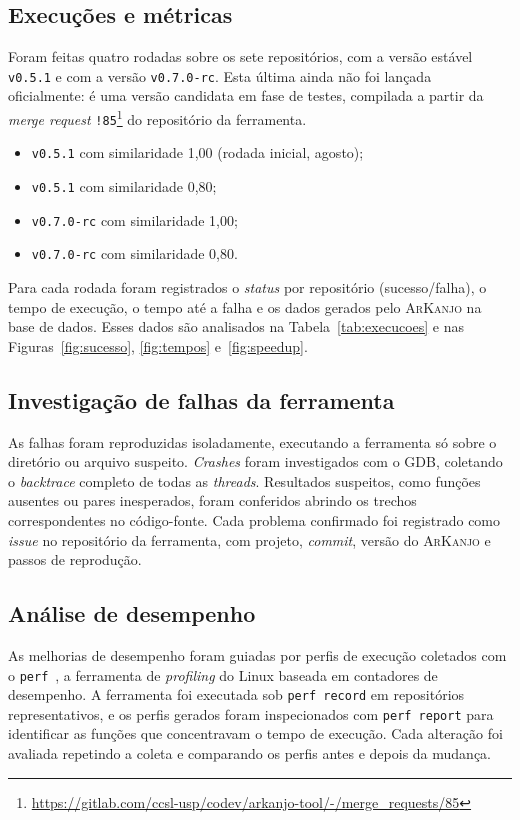 \documentclass{article}
\newcommand{\ark}{\textsc{ArKanjo}}
\newcommand{\vnova}{\texttt{v0.7.0-rc}}
\begin{document}
\subsection{Execuções e métricas}

Foram feitas quatro rodadas sobre os sete repositórios, com a versão estável \texttt{v0.5.1} e com a versão \vnova{}. Esta última ainda não foi lançada oficialmente: é uma versão candidata em fase de testes, compilada a partir da \textit{merge request} \verb|!85|\footnote{\url{https://gitlab.com/ccsl-usp/codev/arkanjo-tool/-/merge_requests/85}} do repositório da ferramenta.

\begin{itemize}
  \item \texttt{v0.5.1} com similaridade 1,00 (rodada inicial, agosto);
  \item \texttt{v0.5.1} com similaridade 0,80;
  \item \vnova{} com similaridade 1,00;
  \item \vnova{} com similaridade 0,80.
\end{itemize}

Para cada rodada foram registrados o \textit{status} por repositório (sucesso/falha), o tempo de execução, o tempo até a falha e os dados gerados pelo \ark{} na base de dados. Esses dados são analisados na Tabela~\ref{tab:execucoes} e nas Figuras~\ref{fig:sucesso}, \ref{fig:tempos} e~\ref{fig:speedup}.

\subsection{Investigação de falhas da ferramenta}

As falhas foram reproduzidas isoladamente, executando a ferramenta só sobre o diretório ou arquivo suspeito. \emph{Crashes} foram investigados com o \textsc{GDB}, coletando o \emph{backtrace} completo de todas as \textit{threads}. Resultados suspeitos, como funções ausentes ou pares inesperados, foram conferidos abrindo os trechos correspondentes no código-fonte. Cada problema confirmado foi registrado como \textit{issue} no repositório da ferramenta, com projeto, \textit{commit}, versão do \ark{} e passos de reprodução.

\subsection{Análise de desempenho}

As melhorias de desempenho foram guiadas por perfis de execução coletados com o \texttt{perf}~\cite{perf}, a ferramenta de \emph{profiling} do Linux baseada em contadores de desempenho. A ferramenta foi executada sob \texttt{perf record} em repositórios representativos, e os perfis gerados foram inspecionados com \texttt{perf report} para identificar as funções que concentravam o tempo de execução. Cada alteração foi avaliada repetindo a coleta e comparando os perfis antes e depois da mudança.
\end{document}

